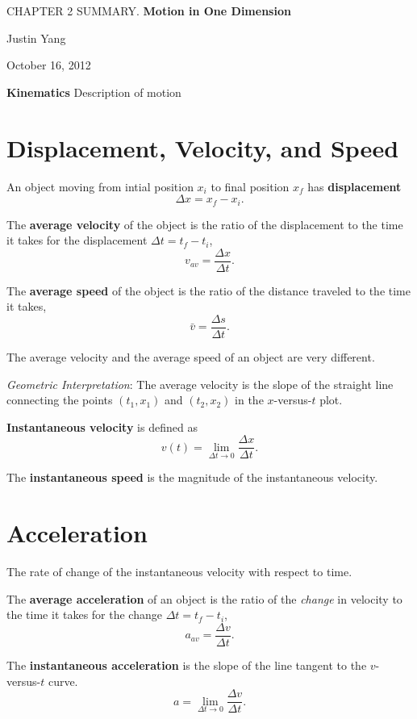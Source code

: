 \documentclass[11pt,a4paper]{report}
\begin{document}
\pagestyle{empty}
\begin{center}
\Large{CHAPTER 2 SUMMARY. \textbf{Motion in One Dimension}}

\large{Justin Yang}

October 16, 2012
\end{center}

\textbf{Kinematics} Description of motion

\section*{Displacement, Velocity, and Speed}

An object moving from intial position $x_{i}$ to final position $x_{f}$ has \textbf{displacement} $$\Delta{x}=x_{f}-x_{i}.$$

\noindent
The \textbf{average velocity} of the object is the ratio of the displacement to the time it takes for the displacement $\Delta{t}=t_{f}-t_{i}$,
$$v_{av}=\frac{\Delta{x}}{\Delta{t}}.$$

\noindent
The \textbf{average speed} of the object is the ratio of the distance traveled to the time it takes, $$\bar{v}=\frac{\Delta{s}}{\Delta{t}}.$$

\noindent
The average velocity and the average speed of an object are very different.

\noindent
\textit{Geometric Interpretation}: The average velocity is the slope of the straight line connecting the points $\left(t_{1}, x_{1}\right)$ and $\left(t_{2}, x_{2}\right)$ in the $x$-versus-$t$ plot.

\noindent
\textbf{Instantaneous velocity} is defined as $$v\left(t\right)=\lim_{\Delta{t} \to 0} \frac{\Delta{x}}{\Delta{t}}.$$

\noindent
The \textbf{instantaneous speed} is the magnitude of the instantaneous velocity.

\section*{Acceleration}

The rate of change of the instantaneous velocity with respect to time.

The \textbf{average acceleration} of an object is the ratio of the \textit{change} in velocity to the time it takes for the change $\Delta{t}=t_{f}-t_{i}$, $$a_{av}=\frac{\Delta{v}}{\Delta{t}}.$$

The \textbf{instantaneous acceleration} is the slope of the line tangent to the $v$-versus-$t$ curve. $$a=\lim_{\Delta{t} \to 0} \frac{\Delta{v}}{\Delta{t}}.$$
\end{document}
